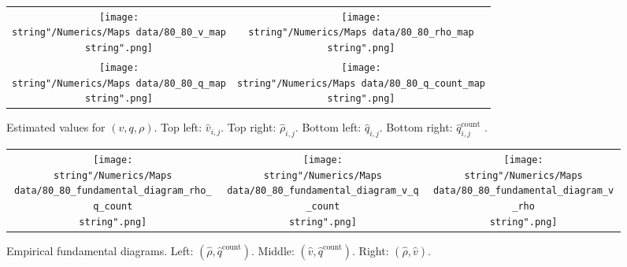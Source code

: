 \documentclass[preprint]{elsarticle}
\begin{document}
\begin{figure}[H]
\centering
\begin{tabular}{cc}
\texttt{[image: \\string"/Numerics/Maps data/80\_80\_v\_map\\string".png]} & \texttt{[image: \\string"/Numerics/Maps data/80\_80\_rho\_map\\string".png]}\tabularnewline
\texttt{[image: \\string"/Numerics/Maps data/80\_80\_q\_map\\string".png]} & \texttt{[image: \\string"/Numerics/Maps data/80\_80\_q\_count\_map\\string".png]}\tabularnewline
\end{tabular}
\protect\caption{Estimated values for $\left(v,q,\rho\right)$. Top left: $\widehat{v}_{i,j}$.
Top right: $\widehat{\rho}_{i,j}$. Bottom left: $\widehat{q}_{i,j}$.
Bottom right: $\widehat{q}_{i,j}^{\text{count}}$ .\label{fig:Estimated-values}}
\end{figure}

\begin{figure}[H]
\centering
\begin{tabular}{ccc}
\texttt{[image: \\string"/Numerics/Maps data/80\_80\_fundamental\_diagram\_rho\_q\_count\\string".png]} & \texttt{[image: \\string"/Numerics/Maps data/80\_80\_fundamental\_diagram\_v\_q\_count\\string".png]} & \texttt{[image: \\string"/Numerics/Maps data/80\_80\_fundamental\_diagram\_v\_rho\\string".png]}\tabularnewline
\end{tabular}
\protect\caption{Empirical fundamental diagrams. Left: $\left(\widehat{\rho},\widehat{q}^{\text{count}}\right)$.
Middle: $\left(\widehat{v},\widehat{q}^{\text{count}}\right)$. Right: $\left(\widehat{\rho},\widehat{v}\right)$.
\label{fig:Empirical-fundamental-diagrams}}
\end{figure}
\end{document}
